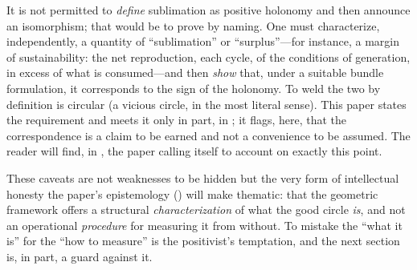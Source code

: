 \begin{claim}[Second caveat: ``sublimation $=$ positive phase'' must be argued, not stipulated]
It is not permitted to \emph{define} sublimation as positive holonomy and then announce an isomorphism; that would be to prove by naming. One must characterize, independently, a quantity of ``sublimation'' or ``surplus''---for instance, a margin of sustainability: the net reproduction, each cycle, of the conditions of generation, in excess of what is consumed---and then \emph{show} that, under a suitable bundle formulation, it corresponds to the sign of the holonomy. To weld the two by definition is circular (a vicious circle, in the most literal sense). This paper states the requirement and meets it only in part, in ; it flags, here, that the correspondence is a claim to be earned and not a convenience to be assumed. The reader will find, in , the paper calling itself to account on exactly this point.
\end{claim}

These caveats are not weaknesses to be hidden but the very form of intellectual honesty the paper's epistemology () will make thematic: that the geometric framework offers a structural \emph{characterization} of what the good circle \emph{is}, and not an operational \emph{procedure} for measuring it from without. To mistake the ``what it is'' for the ``how to measure'' is the positivist's temptation, and the next section is, in part, a guard against it.

